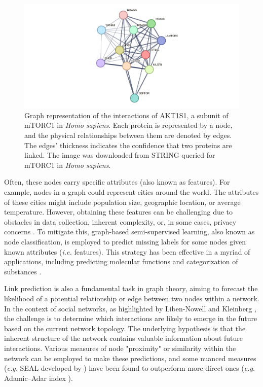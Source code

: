 \documentclass[
11pt, %
oneside, %
english, %
singlespacing, %
headsepline, %
chapterinoneline, %
]{MastersDoctoralThesis} %
\begin{document}
\begin{figure}[h]
	\centering
	\includegraphics[scale=0.5]{figure/mtor}
	\caption{Graph representation of the interactions of AKT1S1, a subunit of mTORC1 in \textit{Homo sapiens}. Each protein is represented by a node, and the physical relationships between them are denoted by edges. The edges' thickness indicates the confidence that two proteins are linked. The image was downloaded from STRING \cite{szklarczykSTRINGV10Protein2015} queried for mTORC1 in \textit{Homo sapiens}.}
	\label{fig:mTOR}
\end{figure}

Often, these nodes carry specific attributes (also known as features). For example, nodes in a graph could represent cities around the world. The attributes of these cities might include population size, geographic location, or average temperature. However, obtaining these features can be challenging due to obstacles in data collection, inherent complexity, or, in some cases, privacy concerns \cite{jiaGraphBeliefPropagation2021}. To mitigate this, graph-based semi-supervised learning, also known as node classification, is employed to predict missing labels for some nodes given known attributes (\textit{i.e.} features). This strategy has been effective in a myriad of applications, including predicting molecular functions and categorization of substances \cite{NIPS2016_390e9825, liDeeperInsightsGraph2018}.

Link prediction is also a fundamental task in graph theory, aiming to forecast the likelihood of a potential relationship or edge between two nodes within a network. In the context of social networks, as highlighted by Liben-Nowell and Kleinberg \cite{liben-nowellLinkPredictionProblem2003}, the challenge is to determine which interactions are likely to emerge in the future based on the current network topology. The underlying hypothesis is that the inherent structure of the network contains valuable information about future interactions. Various measures of node "proximity" or similarity within the network can be employed to make these predictions, and some nuanced measures (\textit{e.g.} SEAL developed by \cite{zhangLinkPredictionBased2018}) have been found to outperform more direct ones (\textit{e.g.} Adamic–Adar index \cite{adamicFriendsNeighborsWeb2003}).
\end{document}
